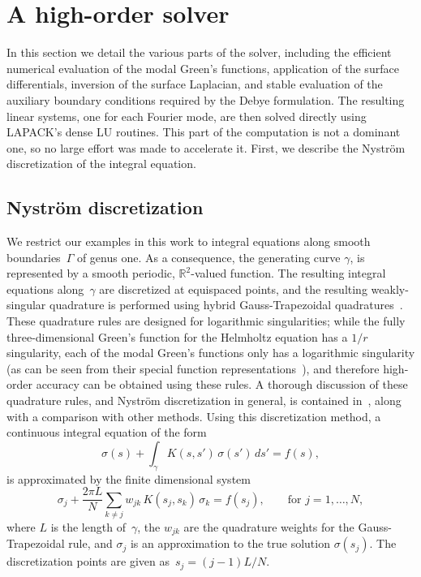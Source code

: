 \documentclass[11pt]{article}
\newcommand{\bbR}{\mathbb R}
\numberwithin{equation}{section}
\begin{document}
\section{A high-order solver}
\label{sec_solver}

In this section we detail the various parts of the solver,
including the efficient numerical evaluation of the modal Green's
functions, application of the surface differentials, inversion of
the surface Laplacian, and stable evaluation of the auxiliary
boundary conditions required by the Debye formulation.
The resulting linear systems, one for each Fourier mode, are then
solved directly using \textsc{LAPACK}'s dense LU routines.
This part of the computation is
not a dominant one, so no large effort was made to accelerate it.
First, we describe the Nystr\"om discretization of the integral equation.


\subsection{Nystr\"om discretization}
\label{sec_nystrom}

We restrict our examples in this work to integral equations along
smooth boundaries~$\Gamma$ of genus one.  As a consequence, the
generating curve $\gamma$, is represented by a smooth periodic, $\bbR^2$-valued function.
The resulting integral equations along~$\gamma$ are discretized at
equispaced points, and the resulting weakly-singular quadrature is
performed using hybrid Gauss-Trapezoidal
quadratures~\cite{alpert}. These quadrature rules are designed for
logarithmic singularities; while the fully three-dimensional Green's
function for the Helmholtz equation has a $1/r$ singularity, each of
the modal Green's functions only has a logarithmic singularity (as can
be seen from their special function representations~\cite{cohl_1999,conway_cohl}), 
and therefore high-order accuracy
can be obtained using these rules.  A thorough discussion of these
quadrature rules, and Nystr\"om discretization in general, is
contained in~\cite{hao_2014}, along with a comparison with other
methods.  Using this discretization method, a continuous integral
equation of the form
\begin{equation}
  \sigma(s) + \int_\gamma K(s,s') \, \sigma(s') \, ds' = f(s),
\end{equation}
is approximated by the finite dimensional system
\begin{equation}
  \sigma_j + \frac{2\pi L}{N} \sum_{k\neq j} w_{jk} \, K(s_j,s_k) \, \sigma_k=
  f(s_j), \qquad \text{for } j = 1,\ldots,N,
\end{equation}
where $L$ is the length of~$\gamma$, the $w_{jk}$ are the quadrature
weights for the Gauss-Trapezoidal rule, and $\sigma_j$ is an
approximation to the true solution $\sigma(s_j)$. The discretization
points are given as~$s_j = (j-1)L/N$.
\end{document}
